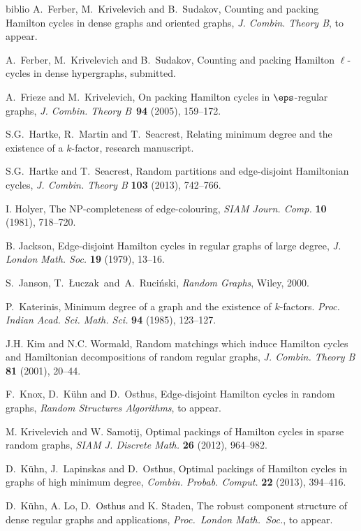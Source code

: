 \begin{thebibliography}{biblio}
 A.~Ferber, M.~Krivelevich and B.~Sudakov,
Counting and packing Hamilton cycles in dense graphs and oriented graphs,  \emph{J. Combin. Theory B}, to appear.

 A.~Ferber, M.~Krivelevich and B.~Sudakov, Counting and packing Hamilton $\ell$-cycles in dense hypergraphs, submitted. 

 A.~Frieze and M.~Krivelevich, On packing Hamilton cycles in $\eps$-regular graphs,
\emph{J. Combin. Theory B}~{\bf{94}} (2005), 159--172.

 S.G.~Hartke, R.~Martin and T.~Seacrest,
Relating minimum degree and the existence of a $k$-factor, research
manuscript.

 S.G.~Hartke and T.~Seacrest, Random partitions
and edge-disjoint Hamiltonian cycles, \emph{J. Combin. Theory B} {\bf 103} (2013), 742--766.

 I. Holyer, The NP-completeness of edge-colouring, \emph{SIAM Journ. Comp.}
{\bf 10} (1981), 718--720.

 B. Jackson, Edge-disjoint Hamilton cycles in regular graphs of large degree,
\emph{J. London Math. Soc.} {\bf 19} (1979), 13--16.


 S.~Janson, T.~{\L}uczak\ and\ A.~Ruci\'nski,
{\em Random Graphs}, Wiley, 2000.

 P.~Katerinis, Minimum degree of a graph and
the existence of $k$-factors. \emph{Proc. Indian Acad. Sci. Math.
Sci.} \textbf{94} (1985), 123--127.


 J.H. Kim and N.C. Wormald, 
Random matchings which induce Hamilton cycles and Hamiltonian decompositions of random regular graphs, 
\emph{J. Combin. Theory B} {\bf 81} (2001), 20--44. 

 F.~Knox, D.~K\"uhn and D.~Osthus, 
Edge-disjoint Hamilton cycles in random graphs, 
\emph{Random Structures Algorithms}, to appear.


 M. Krivelevich and W. Samotij, 
Optimal packings of Hamilton cycles in sparse random graphs,
\emph{SIAM J. Discrete Math.} {\bf 26} (2012), 964--982.


 D.~K\"uhn, J.~Lapinskas and D.~Osthus, Optimal packings of Hamilton cycles in graphs of high minimum degree,
\emph{ Combin. Probab. Comput.} {\bf  22} (2013), 394--416.

 D.~K\"uhn, A. Lo, D.~Osthus and K. Staden, The robust component structure of dense regular graphs and applications, \emph{Proc.~London Math.~Soc.}, to appear.


\end{thebibliography}
